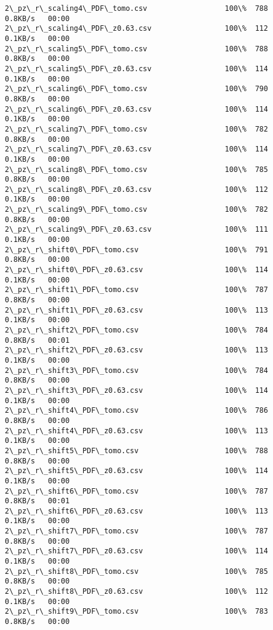 \documentclass[11pt]{article}
\begin{document}
\begin{Verbatim}[commandchars=\\\{\}]
2\_pz\_r\_scaling4\_PDF\_tomo.csv                  100\%  788     0.8KB/s   00:00    
2\_pz\_r\_scaling4\_PDF\_z0.63.csv                 100\%  112     0.1KB/s   00:00    
2\_pz\_r\_scaling5\_PDF\_tomo.csv                  100\%  788     0.8KB/s   00:00    
2\_pz\_r\_scaling5\_PDF\_z0.63.csv                 100\%  114     0.1KB/s   00:00    
2\_pz\_r\_scaling6\_PDF\_tomo.csv                  100\%  790     0.8KB/s   00:00    
2\_pz\_r\_scaling6\_PDF\_z0.63.csv                 100\%  114     0.1KB/s   00:00    
2\_pz\_r\_scaling7\_PDF\_tomo.csv                  100\%  782     0.8KB/s   00:00    
2\_pz\_r\_scaling7\_PDF\_z0.63.csv                 100\%  114     0.1KB/s   00:00    
2\_pz\_r\_scaling8\_PDF\_tomo.csv                  100\%  785     0.8KB/s   00:00    
2\_pz\_r\_scaling8\_PDF\_z0.63.csv                 100\%  112     0.1KB/s   00:00    
2\_pz\_r\_scaling9\_PDF\_tomo.csv                  100\%  782     0.8KB/s   00:00    
2\_pz\_r\_scaling9\_PDF\_z0.63.csv                 100\%  111     0.1KB/s   00:00    
2\_pz\_r\_shift0\_PDF\_tomo.csv                    100\%  791     0.8KB/s   00:00    
2\_pz\_r\_shift0\_PDF\_z0.63.csv                   100\%  114     0.1KB/s   00:00    
2\_pz\_r\_shift1\_PDF\_tomo.csv                    100\%  787     0.8KB/s   00:00    
2\_pz\_r\_shift1\_PDF\_z0.63.csv                   100\%  113     0.1KB/s   00:00    
2\_pz\_r\_shift2\_PDF\_tomo.csv                    100\%  784     0.8KB/s   00:01    
2\_pz\_r\_shift2\_PDF\_z0.63.csv                   100\%  113     0.1KB/s   00:00    
2\_pz\_r\_shift3\_PDF\_tomo.csv                    100\%  784     0.8KB/s   00:00    
2\_pz\_r\_shift3\_PDF\_z0.63.csv                   100\%  114     0.1KB/s   00:00    
2\_pz\_r\_shift4\_PDF\_tomo.csv                    100\%  786     0.8KB/s   00:00    
2\_pz\_r\_shift4\_PDF\_z0.63.csv                   100\%  113     0.1KB/s   00:00    
2\_pz\_r\_shift5\_PDF\_tomo.csv                    100\%  788     0.8KB/s   00:00    
2\_pz\_r\_shift5\_PDF\_z0.63.csv                   100\%  114     0.1KB/s   00:00    
2\_pz\_r\_shift6\_PDF\_tomo.csv                    100\%  787     0.8KB/s   00:01    
2\_pz\_r\_shift6\_PDF\_z0.63.csv                   100\%  113     0.1KB/s   00:00    
2\_pz\_r\_shift7\_PDF\_tomo.csv                    100\%  787     0.8KB/s   00:00    
2\_pz\_r\_shift7\_PDF\_z0.63.csv                   100\%  114     0.1KB/s   00:00    
2\_pz\_r\_shift8\_PDF\_tomo.csv                    100\%  785     0.8KB/s   00:00    
2\_pz\_r\_shift8\_PDF\_z0.63.csv                   100\%  112     0.1KB/s   00:00    
2\_pz\_r\_shift9\_PDF\_tomo.csv                    100\%  783     0.8KB/s   00:00    

\end{Verbatim}
\end{document}
